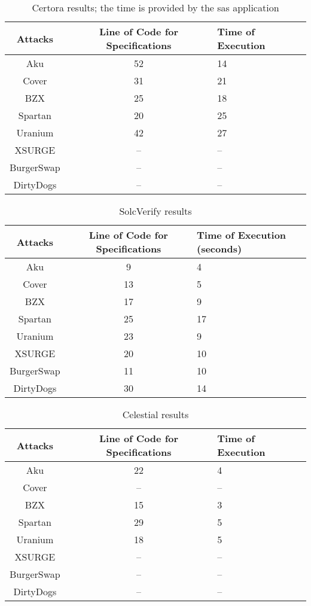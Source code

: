 \begin{table*}
    \caption{Certora results; the time is provided by the sas application}
        \label{tab:CertoraTable}
        \begin{tabular}{ccl}
        \toprule
            Attacks & Line of Code for Specifications & Time of Execution\\
            \midrule
            Aku & 52 & 14 \\ 
            Cover & 31 & 21 \\ 
            BZX & 25  & 18 \\ 
            Spartan & 20  & 25\\ 
            Uranium & 42 & 27  \\ 
            XSURGE &  -- & -- \\  
            BurgerSwap &  -- & --\\ 
            DirtyDogs &  -- & -- \\
        \bottomrule
        \end{tabular}
    \end{table*}
\begin{table*}

\caption{SolcVerify results}
        \label{tab:SolcVerifyTable}
        \begin{tabular}{ccl}
        \toprule
            Attacks & Line of Code for Specifications & Time of Execution (seconds)\\
            \midrule
            Aku & 9 & 4 \\ 
            Cover & 13  & 5 \\ 
            BZX & 17  & 9  \\ 
            Spartan & 25 &  17 \\ 
            Uranium  &  23 & 9 \\ 
            XSURGE & 20 & 10 \\  
            BurgerSwap & 11 & 10  \\ 
            DirtyDogs &  30 &  14\\
        \bottomrule
        \end{tabular}
\end{table*}

\begin{table*}
\caption{Celestial results}
    \label{tab:CelestialTable}
        \begin{tabular}{ccl}
        \toprule
            Attacks & Line of Code for Specifications & Time of Execution\\
            \midrule
            Aku & 22 & 4\\ 
            Cover & --  & -- \\ 
            BZX & 15 & 3\\ 
            Spartan & 29 &  5\\ 
            Uranium & 18 &  5\\ 
            XSURGE &  -- & -- \\  
            BurgerSwap &  -- & --\\ 
            DirtyDogs &  -- & -- \\
        \bottomrule
        \end{tabular}
    \end{table*}


